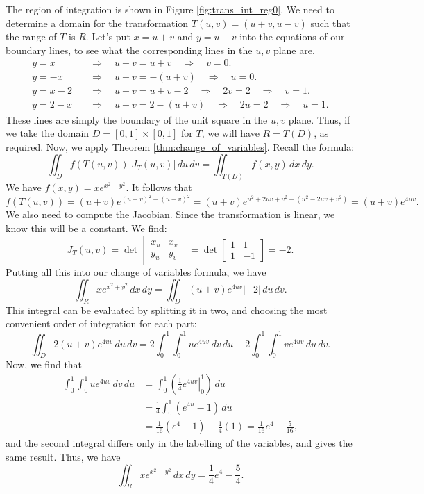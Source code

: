 {The region of integration is shown in Figure \ref{fig:trans_int_reg0}. We need to determine a domain for the transformation $T(u,v)=(u+v,u-v)$ such that the range of $T$ is $R$. Let's put $x=u+v$ and $y=u-v$ into the equations of our boundary lines, to see what the corresponding lines in the $u,v$ plane are.
\begin{align*}
y=x &\quad \Rightarrow \quad u-v = u+v \quad \Rightarrow \quad v=0.\\
y=-x &\quad \Rightarrow \quad u-v = -(u+v) \quad \Rightarrow \quad u=0.\\
y=x-2 &\quad \Rightarrow \quad u-v = u+v-2 \quad \Rightarrow \quad 2v=2 \quad \Rightarrow \quad v=1.\\
y=2-x & \quad \Rightarrow \quad u-v = 2-(u+v) \quad \Rightarrow \quad 2u=2 \quad \Rightarrow \quad u=1.
\end{align*}
These lines are simply the boundary of the unit square in the $u,v$ plane. Thus, if we take the domain $D=[0,1]\times [0,1]$ for $T$, we will have $R=T(D)$, as required. Now, we apply Theorem \ref{thm:change_of_variables}. Recall the formula:
\[
\iint_D f(T(u,v))\lvert J_T(u,v)\rvert\,du\,dv = \iint_{T(D)} f(x,y)\,dx\,dy.
\]
We have $f(x,y) = xe^{x^2-y^2}$. It follows that
\[
f(T(u,v)) = (u+v)e^{(u+v)^2-(u-v)^2}
 = (u+v)e^{u^2+2uv+v^2-(u^2-2uv+v^2)} = (u+v)e^{4uv}.
\]
We also need to compute the Jacobian. Since the transformation is linear, we know this will be a constant. We find:
\[
J_T(u,v) = \det\begin{bmatrix}x_u&x_v\\y_u&y_v\end{bmatrix} = \det\begin{bmatrix}1&1\\1&-1\end{bmatrix} = -2.
\]
Putting all this into our change of variables formula, we have
\[
\iint_R xe^{x^2+y^2}\,dx\,dy = \iint_D (u+v)e^{4uv}\lvert -2\rvert \,du\,dv.
\]
This integral can be evaluated by splitting it in two, and choosing the most convenient order of integration for each part:
\[
\iint_D 2(u+v)e^{4uv} \,du\,dv = 2\int_0^1\int_0^1 ue^{4uv}\,dv\,du + 2\int_0^1\int_0^1 ve^{4uv}\,du\,dv.
\]
Now, we find that
\begin{align*}
\int_0^1\int_0^1 ue^{4uv}\,dv\,du &= \int_0^1\left(\left.\frac14 e^{4uv}\right|_0^1\right)\,du\\
& = \frac14\int_0^1 (e^{4u}-1)\,du\\
& = \frac{1}{16}(e^4-1)-\frac14(1) = \frac{1}{16}e^4-\frac{5}{16},
\end{align*}
and the second integral differs only in the labelling of the variables, and gives the same result. Thus, we have
\[
\iint_R xe^{x^2-y^2}\,dx\,dy = \frac14 e^4-\frac54.
\]
}\\

